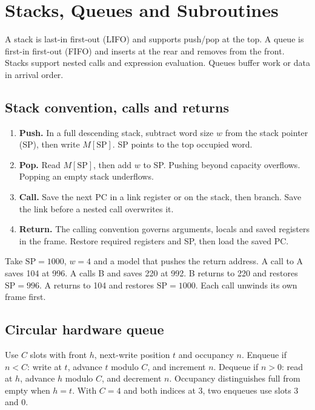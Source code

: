 \documentclass[12pt,a4paper]{article}
\begin{document}
\section{Stacks, Queues and Subroutines}
\begin{tcolorbox}[defbox,title={Stack and queue}]
A stack is last-in first-out (LIFO) and supports push/pop at the top. A queue is first-in first-out (FIFO) and inserts at the rear and removes from the front. Stacks support nested calls and expression evaluation. Queues buffer work or data in arrival order.
\end{tcolorbox}

\subsection{Stack convention, calls and returns}
\begin{enumerate}[leftmargin=*,itemsep=2pt]
\item \textbf{Push.} In a full descending stack, subtract word size $w$ from the stack pointer (SP), then write $M[\mathrm{SP}]$. SP points to the top occupied word.
\item \textbf{Pop.} Read $M[\mathrm{SP}]$, then add $w$ to SP. Pushing beyond capacity overflows. Popping an empty stack underflows.
\item \textbf{Call.} Save the next PC in a link register or on the stack, then branch. Save the link before a nested call overwrites it.
\item \textbf{Return.} The calling convention governs arguments, locals and saved registers in the frame. Restore required registers and SP, then load the saved PC.
\end{enumerate}
\begin{tcolorbox}[examplebox,title={Trace a nested call with a downward-growing stack}]
Take $\mathrm{SP}=1000$, $w=4$ and a model that pushes the return address. A call to A saves 104 at 996. A calls B and saves 220 at 992. B returns to 220 and restores $\mathrm{SP}=996$. A returns to 104 and restores $\mathrm{SP}=1000$. Each call unwinds its own frame first.
\end{tcolorbox}
\subsection{Circular hardware queue}
Use $C$ slots with front $h$, next-write position $t$ and occupancy $n$. Enqueue if $n<C$: write at $t$, advance $t$ modulo $C$, and increment $n$. Dequeue if $n>0$: read at $h$, advance $h$ modulo $C$, and decrement $n$. Occupancy distinguishes full from empty when $h=t$. With $C=4$ and both indices at 3, two enqueues use slots 3 and 0.
\end{document}

